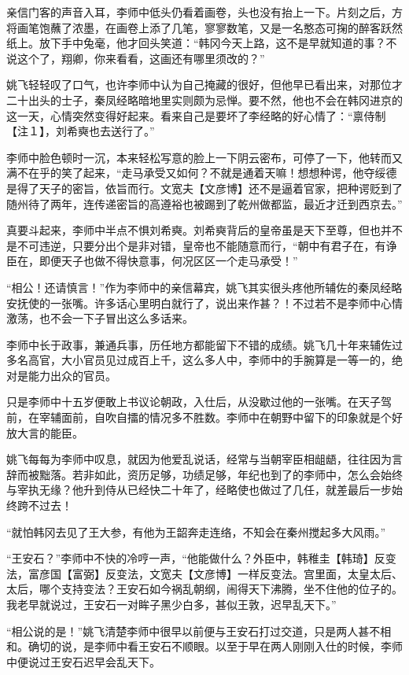 亲信门客的声音入耳，李师中低头仍看着画卷，头也没有抬上一下。片刻之后，方将画笔饱蘸了浓墨，在画卷上添了几笔，寥寥数笔，又是一名憨态可掬的醉客跃然纸上。放下手中兔毫，他才回头笑道：“韩冈今天上路，这不是早就知道的事？不说这个了，翔卿，你来看看，这画还有哪里须改的？”

姚飞轻轻叹了口气，也许李师中认为自己掩藏的很好，但他早已看出来，对那位才二十出头的士子，秦凤经略暗地里实则颇为忌惮。要不然，他也不会在韩冈进京的这一天，心情突然变得好起来。看来自己是要坏了李经略的好心情了：“禀侍制【注１】，刘希奭也去送行了。”

李师中脸色顿时一沉，本来轻松写意的脸上一下阴云密布，可停了一下，他转而又满不在乎的笑了起来，“走马承受又如何？不就是通着天嘛！想想种谔，他夺绥德是得了天子的密旨，依旨而行。文宽夫【文彦博】还不是逼着官家，把种谔贬到了随州待了两年，连传递密旨的高遵裕也被踢到了乾州做都监，最近才迁到西京去。”

真要斗起来，李师中半点不惧刘希奭。刘希奭背后的皇帝虽是天下至尊，但也并不是不可违逆，只要分出个是非对错，皇帝也不能随意而行，“朝中有君子在，有诤臣在，即便天子也做不得快意事，何况区区一个走马承受！”

“相公！还请慎言！”作为李师中的亲信幕宾，姚飞其实很头疼他所辅佐的秦凤经略安抚使的一张嘴。许多话心里明白就行了，说出来作甚？！不过若不是李师中心情激荡，也不会一下子冒出这么多话来。

李师中长于政事，兼通兵事，历任地方都能留下不错的成绩。姚飞几十年来辅佐过多名高官，大小官员见过成百上千，这么多人中，李师中的手腕算是一等一的，绝对是能力出众的官员。

只是李师中十五岁便敢上书议论朝政，入仕后，从没歇过他的一张嘴。在天子驾前，在宰辅面前，自吹自擂的情况多不胜数。李师中在朝野中留下的印象就是个好放大言的能臣。

姚飞每每为李师中叹息，就因为他爱乱说话，经常与当朝宰臣相龃龉，往往因为言辞而被黜落。若非如此，资历足够，功绩足够，年纪也到了的李师中，怎么会始终与宰执无缘？他升到侍从已经快二十年了，经略使也做过了几任，就差最后一步始终跨不过去！

“就怕韩冈去见了王大参，有他为王韶奔走连络，不知会在秦州搅起多大风雨。”

“王安石？”李师中不快的冷哼一声，“他能做什么？外臣中，韩稚圭【韩琦】反变法，富彦国【富弼】反变法，文宽夫【文彦博】一样反变法。宫里面，太皇太后、太后，哪个支持变法？王安石如今祸乱朝纲，闹得天下沸腾，坐不住他的位子的。我老早就说过，王安石一对眸子黑少白多，甚似王敦，迟早乱天下。”

“相公说的是！”姚飞清楚李师中很早以前便与王安石打过交道，只是两人甚不相和。确切的说，是李师中看王安石不顺眼。以至于早在两人刚刚入仕的时候，李师中便说过王安石迟早会乱天下。

